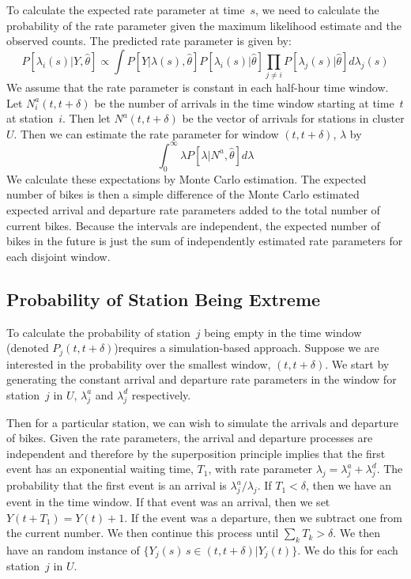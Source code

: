 \documentclass{acm_proc_article-sp}
\begin{document}
To calculate the expected rate parameter at time~$s$, we need to calculate the probability of the rate parameter given the maximum likelihood estimate and the observed counts. The predicted rate parameter is given by:
\begin{equation*}
P [ \lambda_i (s) | Y, \hat{\theta} ] \propto \int P [ Y | \lambda (s), \hat{\theta} ] P [ \lambda_i (s) | \hat{\theta} ] \prod_{j \neq i} P [ \lambda_j (s) | \hat{\theta} ] d \lambda_j (s)
\end{equation*}
\noindent We assume that the rate parameter is constant in each half-hour time window.  Let $N^{a}_i(t, t+\delta)$ be the number of arrivals in the time window starting at time~$t$ at station~$i$.  Then let $N^{a} (t, t+\delta)$ be the vector of arrivals for stations in cluster $U$.  Then we can estimate the rate parameter for window $(t, t+\delta)$, $\lambda$ by 
\begin{equation*}
\int_0^\infty \lambda P [ \lambda | N^{a}, \hat{\theta} ] d\lambda
\end{equation*}
\noindent We calculate these expectations by Monte Carlo estimation.  The expected number of bikes is then a simple difference of the Monte Carlo estimated expected arrival and departure rate parameters added to the total number of current bikes.  Because the intervals are independent, the expected number of bikes in the future is just the sum of independently estimated rate parameters for each disjoint window.

\subsection{Probability of Station Being Extreme}

To calculate the probability of station~$j$ being empty in the time window (denoted $P_j (t, t+\delta)$)requires a simulation-based approach.  Suppose we are interested in the probability over the smallest window, $(t, t+\delta)$.  We start by generating the constant arrival and departure rate parameters in the window for station~$j$ in $U$, $\lambda^{a}_j$ and $\lambda^{d}_j$ respectively. 

Then for a particular station, we can wish to simulate the arrivals and departure of bikes.  Given the rate parameters, the arrival and departure processes are independent and therefore by the superposition principle implies that the first event has an exponential waiting time, $T_1$, with rate parameter $\lambda_j = \lambda^{a}_j + \lambda^{d}_j$.  The probability that the first event is an arrival is $\lambda^{a}_j / \lambda_j$.   If $T_1 < \delta$, then we have an event in the time window.  If that event was an arrival, then we set $Y(t+T_1) = Y(t) + 1$.  If the event was a departure, then we subtract one from the current number.  We then continue this process until $\sum_{k} T_k > \delta$.  We then have an random instance of $\{ Y_j(s) \, s \in (t, t+\delta) | Y_j(t) \}$.  We do this for each station~$j$ in $U$.
\end{document}
